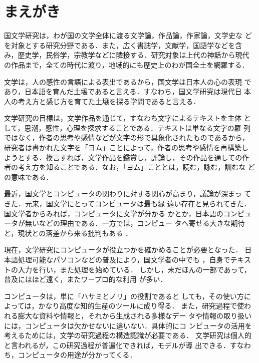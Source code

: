 
\makeatletter
\def\figcap#1#2{}
\def\tblcap#1#2{}
\makeatother


\maketitle


\section{まえがき}
国文学研究は，わが国の文学全体に渡る文学論，作品論，作家論，文学史な
どを対象とする研究分野である．また，広く書誌学，文献学，国語学などを含
み，歴史学，民俗学，宗教学などに隣接する．研究対象は上代の神話から現代
の作品まで，全ての時代に渡り，地域的にも歴史上のわが国全土を網羅する．

文学は，人の感性の言語による表出であるから，国文学は日本人の心の表現
であり，日本語を育んだ土壌であると言える．すなわち，国文学研究は現代日
本人の考え方と感じ方を育てた土壌を探る学問であると言える．

文学研究の目標は，文学作品を通じて，すなわち文字によるテキストを主体
として，思潮，感性，心理を探求することである．テキストは単なる文字の羅
列ではなく，作者の思考や感情などが文字の形で具象化されたものであるから，
研究者は書かれた文字を「ヨム」ことによって，作者の思考や感情を再構築し
ようとする．換言すれば，文学作品を鑑賞し，評論し，その作品を通しての作
者の考え方を知ることである．なお，「ヨム」こととは，読む，詠む，訓むな
どの意味である．

最近，国文学とコンピュータの関わりに対する関心が高まり，議論が深まっ
てきた\cite{Jinbun1989-1990}．元来，国文学にとってコンピュータは最も縁
遠い存在と見られてきた．国文学者からみれば，コンピュータに文学が分かる
かとか，日本語のコンピュータが無いなどの理由である．一方では，コンピュー
タへ寄せる大きな期待と，現状との落差から来る批判もある
\cite{Kokubun1982,Kokubun1992,Kokubun1989-1994}．

現在，文学研究にコンピュータが役立つかを確かめることが必要となった．
日本語処理可能なパソコンなどの普及により，国文学者の中でも
\cite{DB-West1995}，自身でテキストの入力を行い，また処理を始めている．
しかし，未だほんの一部であって，普及にはほど遠く，またワープロ的な利用
が多い．

コンピュータは，単に「ハサミとノリ」の役割\cite{Murakami1989}であると
しても，その使い方によっては，かなり高度な知的生産のツールに成り得る．
また，研究過程で使われる膨大な資料や情報と，それから生成される多様なデー
タや情報の取り扱いには，コンピュータは欠かせないに違いない．具体的にコ
ンピュータの活用を考えるためには，文学の研究過程の構造認識が必要である．
文学研究は個人的と言われるが，この研究過程が普遍化できれば，モデルが導
出できる．すなわち，コンピュータの用途が分かってくる．

